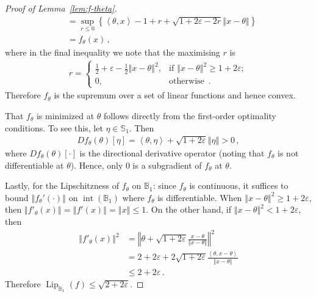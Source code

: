\documentclass[letter, 12pt]{report}
\newcommand{\ip}[1]{\left \langle #1 \right \rangle}
\newcommand{\sphere}{\mathbb{S}}
\newcommand{\ball}{\mathbb{B}}
\newcommand{\norm}[1]{\left \Vert  #1 \right \Vert}
\newcommand{\lip}{\operatorname{Lip}}
\newcommand{\interior}{\operatorname{int}}
\newcommand{\1}{\mathbf{1}}
\renewcommand{\epsilon}{\varepsilon}
\theoremstyle{plain}
\theoremstyle{definition}
\theoremstyle{remark}
\begin{document}
\begin{proof}[Proof of Lemma~\ref{lem:f-theta}]
\begin{align}
         & = \sup_{r \leq 0} \left\{  \ip{\theta, x} - 1 + r + \sqrt{1 + 2\epsilon - 2r} \norm{x - \theta} \right\}      \label{eq:f-lower-bound} \\
         & = f_\theta(x) \,,\nonumber
    \end{align}
    where in the final inequality we note that the maximising $r$ is
    \begin{align*}
        r = \begin{cases}
                \frac{1}{2} + \epsilon - \frac{1}{2}\norm{x - \theta}^2, & \text{if } \norm{x - \theta}^2 \geq 1 + 2\epsilon; \\
                0,                                                       & \text{otherwise } \,.
            \end{cases}
    \end{align*}
    Therefore $f_\theta$ is the supremum over a set of linear functions and hence convex.

    That $f_\theta$ is minimized at $\theta$ follows directly from the first-order optimality conditions.
    To see this, let $\eta \in \sphere_1$. Then
    \begin{align*}
        Df_\theta(\theta)[\eta] = \ip{\theta, \eta} + \sqrt{1 + 2 \epsilon} \norm{\eta} > 0 \,,
    \end{align*}
    where $Df_\theta(\theta)[\cdot]$ is the directional derivative operator (noting that $f_\theta$ is not differentiable at $\theta$).
    Hence, only 0 is a subgradient of $f_\theta$ at $\theta$.

    Lastly, for the Lipschitzness of $f_\theta$ on $\ball_1$: since $f_\theta$ is continuous, it suffices to bound $\norm{f_\theta'(\cdot)}$ on $\interior(\ball_1)$ where $f_\theta$ is
    differentiable.
    When $\norm{x - \theta}^2 \geq 1 + 2 \epsilon$, then $\norm{f'_\theta(x)} = \norm{f'(x)} = \norm{x} \leq 1$.
    On the other hand, if $\norm{x - \theta}^2 < 1 + 2 \epsilon$, then
    \begin{align*}
        \norm{f'_\theta(x)}^2
         & = \norm{\theta + \sqrt{1 + 2\epsilon} \frac{x - \theta}{\norm{x - \theta}}}^2             \\
         & = 2 + 2\epsilon + 2\sqrt{1 + 2\epsilon} \frac{\ip{\theta, x - \theta}}{\norm{x - \theta}} \\
         & \leq 2 + 2\epsilon \,.
    \end{align*}
    Therefore $\lip_{\ball_1}(f) \leq \sqrt{2 + 2\epsilon}$.
\end{proof}
\end{document}
